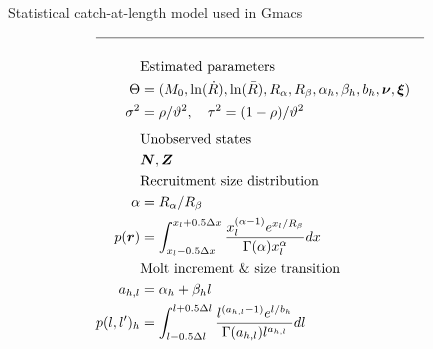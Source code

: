 \begin{table}
  \centering
\caption{Statistical catch-at-length model used in Gmacs}
\label{tab:statistical_catch_length_model}
\tableEq
    \begin{align}
        \hline \nonumber \\
        &\mbox{Estimated parameters} \nonumber\\
        \Theta&= 
                (M_0,\ln(\dot{R}),\ln(\bar{R}),R_\alpha,R_\beta, 
                \alpha_h, \beta_h,b_h, \bs{\nu},\bs{\xi})\label{T4.1}\\
        \sigma^2&=\rho /\vartheta^2, \quad
        \tau^2=(1-\rho)/\vartheta^2\label{T4.2}\\[1ex]
        &\mbox{Unobserved states} \nonumber\\
        &\boldsymbol{N},\boldsymbol{Z}    \label{T4.3}\\
    	&\mbox{Recruitment size distribution} \nonumber\\
    	\alpha &= R_\alpha /R_\beta \nonumber \\
    	p(\boldsymbol{r}) &= \int_{x_l-0.5\Delta x}^{x_l+0.5\Delta x} 
    	\frac{x_l^{(\alpha-1)}e^{x_l/R_\beta}}{\Gamma(\alpha)x_l^\alpha}dx 
        \label{T4.4}\\
        &\mbox{Molt increment \& size transition} \nonumber\\  
        a_{h,l} &= \alpha_h + \beta_h l \label{T4.5} \\
        p({l},{l'})_h &= \int_{l-0.5\Delta l}^{l+0.5\Delta l}
        \frac{ l^{(a_{h,l}-1)} e^{l/b_h} }
        { \Gamma(a_{h,l}) l^{a_{h,l}} } dl \label{T4.6} \\

\end{align}
\end{table}
